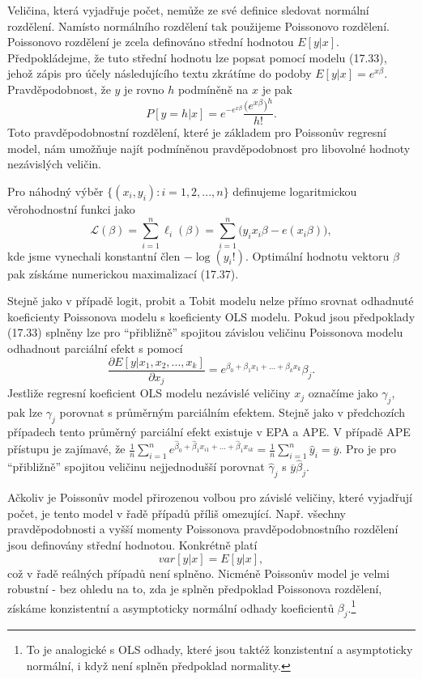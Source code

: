 Veličina, která vyjadřuje počet, nemůže ze své definice sledovat normální rozdělení. Namísto normálního rozdělení tak použijeme Poissonovo rozdělení. Poissonovo rozdělení je zcela definováno střední hodnotou $E[y|x]$. Předpokládejme, že tuto střední hodnotu lze popsat pomocí modelu (17.33), jehož zápis pro účely následujícího textu zkrátíme do podoby $E[y|x] = e^{x\beta}$. Pravděpodobnost, že $y$ je rovno $h$ podmíněně na $x$ je pak
\begin{equation}
P[y = h | x] = e^{-e^{x\beta}}\frac{\Big(e^{x\beta}\Big)^h}{h!}.
\end{equation}
Toto pravděpodobnostní rozdělení, které je základem pro Poissonův regresní model, nám umožňuje najít podmíněnou pravděpodobnost pro libovolné hodnoty nezávislých veličin.

Pro náhodný výběr $\{(x_i, y_i): i = 1, 2, ..., n\}$ definujeme logaritmickou věrohodnostní funkci jako
\begin{equation}
\mathscr{L}(\beta) = \sum_{i = 1}^n \ell_i(\beta) = \sum_{i = 1}^n \Big(y_i x_i \beta - e(x_i \beta) \Big),
\end{equation}
kde jsme vynechali konstantní člen $-\log(y_i!)$. Optimální hodnotu vektoru $\beta$ pak získáme numerickou maximalizací (17.37).

Stejně jako v případě logit, probit a Tobit modelu nelze přímo srovnat odhadnuté koeficienty Poissonova modelu s koeficienty OLS modelu. Pokud jsou předpoklady (17.33) splněny lze pro ``přibližně'' spojitou závislou veličinu Poissonova modelu odhadnout parciální efekt s pomocí
\begin{equation}
\frac{\partial E[y | x_1, x_2, ..., x_k]}{\partial x_j} = e^{\beta_0 + \beta_1 x_1 + ... + \beta_k x_k} \beta_j.
\end{equation}
Jestliže regresní koeficient OLS modelu nezávislé veličiny $x_j$ označíme jako $\gamma_j$, pak lze $\gamma_j$ porovnat s průměrným parciálním efektem. Stejně jako v předchozích případech tento průměrný parciální efekt existuje v EPA a APE. V případě APE přístupu je zajímavé, že $\frac{1}{n}\sum_{i = 1}^n e^{\hat{\beta}_0 + \hat{\beta}_1 x_{i1} + ... + \hat{\beta}_1 x_{ik}} = \frac{1}{n} \sum_{i = 1}^n \hat{y}_i = \overline{y}$. Pro je pro ``přibližně'' spojitou veličinu nejjednodušší porovnat $\hat{\gamma}_j$ s $\overline{y}\hat{\beta}_j$.

Ačkoliv je Poissonův model přirozenou volbou pro závislé veličiny, které vyjadřují počet, je tento model v řadě případů příliš omezující. Např. všechny pravděpodobnosti a vyšší momenty Poissonova pravděpodobnostního rozdělení jsou definovány střední hodnotou. Konkrétně platí
\begin{equation}
var[y|x] = E[y|x],
\end{equation}
což v řadě reálných případů není splněno. Nicméně Poissonův model je velmi robustní - bez ohledu na to, zda je splněn předpoklad Poissonova rozdělení, získáme konzistentní a asymptoticky normální odhady koeficientů $\beta_j$.\footnote{To je analogické s OLS odhady, které jsou taktéž konzistentní a asymptoticky normální, i když není splněn předpoklad normality.}

